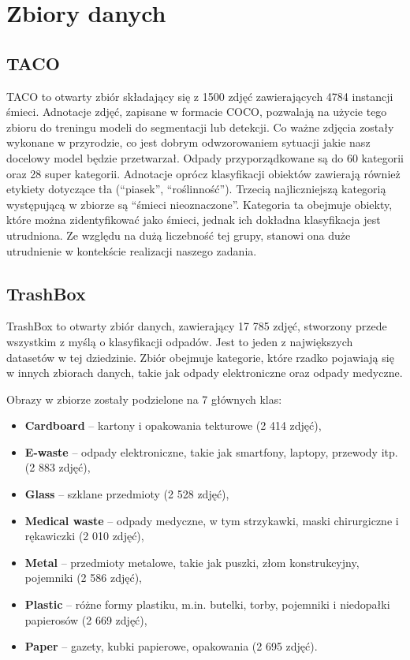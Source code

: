 \documentclass[licencjacka]{pracamgr}
\begin{document}
\chapter{Zbiory danych}\label{Zbiory}

\section{TACO}

TACO to otwarty zbiór składający się z 1500 zdjęć zawierających 4784 instancji śmieci. Adnotacje zdjęć, zapisane w formacie COCO, pozwalają na użycie tego zbioru do treningu modeli do segmentacji lub detekcji. Co ważne zdjęcia zostały wykonane w przyrodzie, co jest dobrym odwzorowaniem sytuacji jakie nasz docelowy model będzie przetwarzał. Odpady przyporządkowane są do 60 kategorii oraz 28 super kategorii. Adnotacje oprócz klasyfikacji obiektów zawierają również etykiety dotyczące tła (“piasek”, “roślinność”). Trzecią najliczniejszą kategorią występującą w zbiorze są “śmieci nieoznaczone”. Kategoria ta obejmuje obiekty, które można zidentyfikować jako śmieci, jednak ich dokładna klasyfikacja jest utrudniona. Ze względu na dużą liczebność tej grupy, stanowi ona duże utrudnienie w kontekście realizacji naszego zadania.

\section{TrashBox}

TrashBox to otwarty zbiór danych, zawierający 17 785 zdjęć, stworzony przede wszystkim z myślą o klasyfikacji odpadów. Jest to jeden z największych datasetów w tej dziedzinie. Zbiór obejmuje kategorie, które rzadko pojawiają się w innych zbiorach danych, takie jak odpady elektroniczne oraz odpady medyczne.  

Obrazy w zbiorze zostały podzielone na 7 głównych klas:  
\begin{itemize}
    \item \textbf{Cardboard} – kartony i opakowania tekturowe (2 414 zdjęć),
    \item \textbf{E-waste} – odpady elektroniczne, takie jak smartfony, laptopy, przewody itp. (2 883 zdjęć),
    \item \textbf{Glass} – szklane przedmioty (2 528 zdjęć),
    \item \textbf{Medical waste} – odpady medyczne, w tym strzykawki, maski chirurgiczne i rękawiczki (2 010 zdjęć),
    \item \textbf{Metal} – przedmioty metalowe, takie jak puszki, złom konstrukcyjny, pojemniki (2 586 zdjęć),
    \item \textbf{Plastic} – różne formy plastiku, m.in. butelki, torby, pojemniki i niedopałki papierosów (2 669 zdjęć),
    \item \textbf{Paper} – gazety, kubki papierowe, opakowania (2 695 zdjęć).
\end{itemize}
\end{document}
